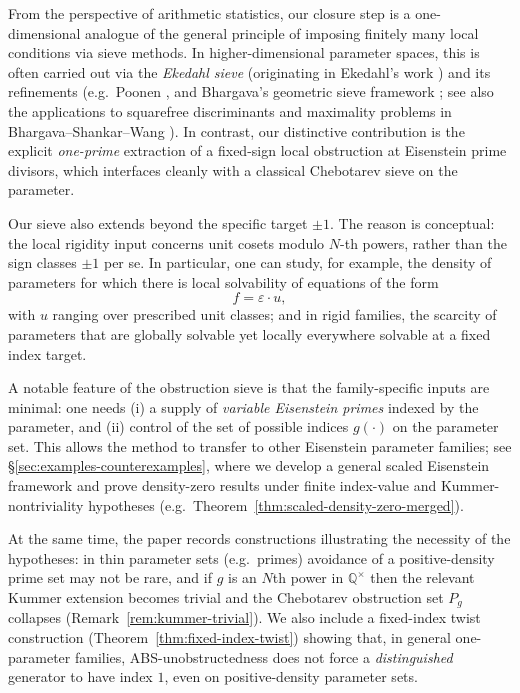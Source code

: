 \documentclass[11pt,letterpaper]{amsart}
\newcommand{\Q}{\mathbb{Q}}
\theoremstyle{plain}
\theoremstyle{definition}
\theoremstyle{remark}
\theoremstyle{plain}
\begin{document}
From the perspective of arithmetic statistics, our closure step is a one-dimensional analogue of the general principle of imposing finitely many local conditions via sieve methods.  In higher-dimensional parameter spaces, this is often carried out via the \emph{Ekedahl sieve} (originating in Ekedahl's work \cite{Ekedahl1991})
and its refinements (e.g.\ Poonen \cite{Poonen2003Squarefree}, and Bhargava's geometric sieve
framework \cite{Bhargava2014GeometricSieve}; see also the applications to squarefree discriminants and maximality problems in Bhargava--Shankar--Wang \cite{BSW-I,BSW-II}). In contrast, our distinctive contribution is the explicit \emph{one-prime} extraction of a fixed-sign local obstruction at Eisenstein prime divisors, which interfaces cleanly with a classical Chebotarev sieve on the parameter.

Our sieve also extends beyond the specific target $\pm1 $. The reason is conceptual: the local rigidity input concerns unit cosets modulo $N$-th powers, rather than the sign classes ${\pm1} $ per se. In particular, one can study, for example, the density of parameters for which there is local solvability of equations of the form
  \[
  f=\varepsilon\cdot u,
  \]
with $u$ ranging over prescribed unit classes; and in rigid families, the scarcity of parameters that are globally solvable yet locally everywhere solvable at a fixed index target.

A notable feature of the obstruction sieve is that the family-specific inputs are minimal: one needs (i) a supply of \emph{variable Eisenstein primes} indexed by the parameter, and
(ii) control of the set of possible indices $g(\cdot)$ on the parameter set.
This allows the method to transfer to other Eisenstein parameter families; see
\S\ref{sec:examples-counterexamples}, where we develop a general scaled Eisenstein framework and prove density-zero results under finite index-value and Kummer-nontriviality hypotheses (e.g.\ Theorem~\ref{thm:scaled-density-zero-merged}).

At the same time, the paper records constructions illustrating the necessity of the hypotheses: in thin parameter sets (e.g.\ primes) avoidance of a positive-density prime set may not be rare,
and if $g$ is an $N$th power in $\Q^\times$ then the relevant Kummer extension becomes trivial and the
Chebotarev obstruction set $P_g$ collapses (Remark~\ref{rem:kummer-trivial}). We also include a fixed-index twist construction (Theorem~\ref{thm:fixed-index-twist}) showing that,
in general one-parameter families, ABS-unobstructedness does not force a \emph{distinguished} generator to have index $1$, even on positive-density parameter sets.
\end{document}
